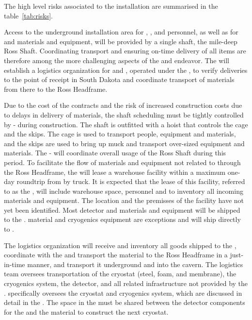 The high level risks associated to the  installation are summarised in the table~\ref{tab:risks}.


Access to the underground installation area for , , and  personnel, as well as for  and  materials and equipment, will be provided by a single shaft, the mile-deep Ross Shaft.
Coordinating transport and ensuring on-time delivery of all items are therefore among the more challenging aspects of the  and  endeavor.
The  will establish a logistics organization for  and , operated under the , to verify deliveries to the point of receipt in South Dakota and coordinate transport of materials from there to the Ross Headframe.

Due to the cost of the  contracts and the risk of increased construction costs due to delays in delivery of materials, the shaft scheduling must be tightly controlled by - during construction.
The shaft is outfitted with a hoist that controls the cage and the skips.
The cage is used to transport people, equipment and materials, and the skips are used to bring up muck and transport over-sized equipment and materials.
The -  will coordinate overall usage of the Ross Shaft during this period.
To facilitate the flow of materials and equipment not related to  through the Ross Headframe, the  will lease a warehouse facility within a maximum one-day roundtrip from  by truck.
It is expected that the lease of this facility, referred to as the , will include warehouse space, personnel and  to inventory all incoming materials and equipment.
The location and the premisses  of the facility have not yet been identified.
Most detector and materials and equipment will be shipped to the .
 material and cryogenics equipment are exceptions and will ship directly to .

The  logistics organization will receive and inventory all goods shipped to the , coordinate with the  and transport the material to the Ross Headframe in a just-in-time manner, and transport it underground and into the cavern.
The  logistics team oversees transportation of the cryostat (steel, foam, and membrane), the cryogenics system, the detector, and all related infrastructure not provided by the .
 specifically oversees the cryostat and cryogenics system, which are discussed in detail in the  .
The space in the  must be shared between the detector components for the  and the  material to construct the next cryostat.


